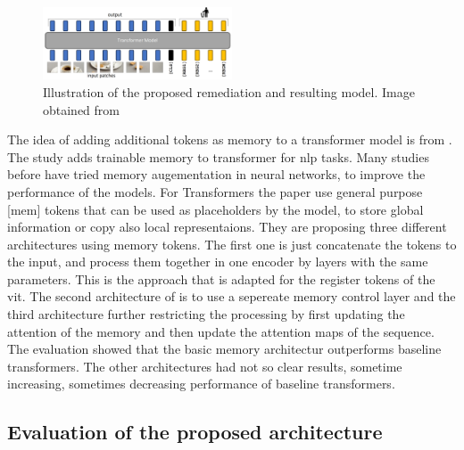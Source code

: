 \documentclass[conference]{IEEEtran}
\begin{document}
  \begin{figure}
    \centering
    \includegraphics[width=0.5\textwidth]{figures/register-architecture.png}
    \caption{Illustration of the proposed remediation and resulting model. Image obtained from \cite{registers}}
    \label{fig:register-architecture}
  \end{figure}

  The idea of adding additional tokens as memory to a transformer model is from \cite{memorytransformer}. The study adds trainable memory to transformer for \ac{nlp} tasks. Many studies before have tried memory augementation in neural networks, to improve the performance of the models. For Transformers the paper use general purpose [mem] tokens that can be used as placeholders by the model, to store global information or copy also local representaions. They are proposing three different architectures using memory tokens. The first one is just concatenate the tokens to the input, and process them together in one encoder by layers with the same parameters. This is the approach that is adapted for the register tokens of the \ac{vit}. The second architecture of \cite{memorytransformer} is to use a sepereate memory control layer and the third architecture further restricting the processing by first updating the attention of the memory and then update the attention maps of the sequence. The evaluation showed that the basic memory architectur outperforms baseline transformers. The other architectures had not so clear results, sometime increasing, sometimes decreasing performance of baseline transformers.

  \subsection{Evaluation of the proposed architecture}
  \label{sec:registers:evaluation}
\end{document}
